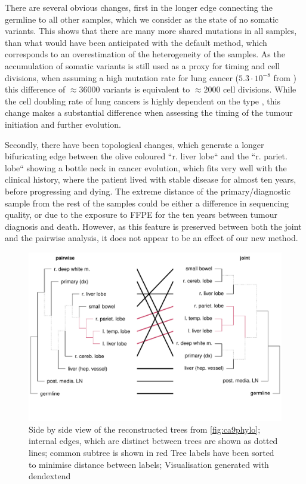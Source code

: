 
There are several obvious changes, first in the longer edge connecting the germline to all other samples, which we consider as the state of no somatic variants. This shows that there are many more shared mutations in all samples, than what would have been anticipated with the default method, which corresponds to an overestimation of the heterogeneity of the samples. As the accumulation of somatic variants is still used as a proxy for timing and cell divisions, when assuming a high mutation rate for lung cancer ($5.3 \cdot 10^{-8}$ from \citeauthor*{Werner2020} \cite{Werner2020}) this difference of $\approx 36000$ variants is equivalent to $\approx 2000$ cell divisions. While the cell doubling rate of lung cancers is highly dependent on the type \cite{Arai1994}, this change makes a substantial difference when assessing the timing of the tumour initiation and further evolution. 

Secondly, there have been topological changes, which generate a longer bifuricating edge between the olive coloured ``r. liver lobe`` and the ``r. pariet. lobe`` showing a bottle neck in cancer evolution, which fits very well with the clinical history, where the patient lived with stable disease for almost ten years, before progressing and dying. The extreme distance of the primary/diagnostic sample from the rest of the samples could be either a difference in sequencing quality, or due to the exposure to FFPE for the ten years between tumour diagnosis and death. However, as this feature is preserved between both the joint and the pairwise analysis, it does not appear to be an effect of our new method.

\begin{figure}[!ht]
\centering
\includegraphics[width=.99\linewidth]{Figures/tanglePhyloCA9.pdf}
\caption[Tanglegram of the reconstructed phylogenies]{Side by side view of the reconstructed trees from \autoref{fig:ca9phylo}; internal edges, which are distinct between trees are shown as dotted lines; common subtree is shown in red  Tree labels have been sorted to minimise distance between labels; Visualisation generated with dendextend \cite{Galili2015}}\label{fig:tanglePhyloCA9}
\end{figure}

